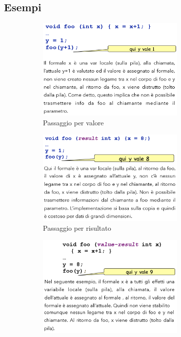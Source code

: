 \documentclass[a4paper,oneside,titlepage]{book}
\begin{document}
\subsection{Esempi}
\begin{figure}[htp]
	\begin{subfigure}{0.49\textwidth}
		\centering
		\includegraphics[width=0.8\textwidth, height=0.8\textheight, keepaspectratio]{val.png} 
		\caption{Passaggio per valore}
	\end{subfigure}
	\begin{subfigure}{0.49\textwidth}
		\centering
		\includegraphics[width=0.8\textwidth, height=0.8\textheight, keepaspectratio]{res.png}
		\caption{Passaggio per risultato}
	\end{subfigure}
	\begin{subfigure}{0.49\textwidth}
		\centering
		\includegraphics[width=0.8\textwidth, height=0.8\textheight, keepaspectratio]{valRes.png} 

\end{subfigure}
\end{figure}
\end{document}
